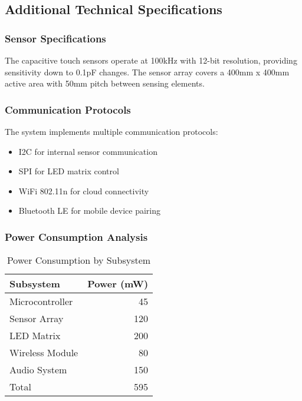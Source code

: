 \documentclass[final]{designreport}
\begin{document}
\printbibliography

\makeappendix

\subsection{Additional Technical Specifications}

\subsubsection{Sensor Specifications}
The capacitive touch sensors operate at 100kHz with 12-bit resolution, providing sensitivity down to 0.1pF changes. The sensor array covers a 400mm x 400mm active area with 50mm pitch between sensing elements.

\subsubsection{Communication Protocols}
The system implements multiple communication protocols:
\begin{itemize}
    \item I2C for internal sensor communication
    \item SPI for LED matrix control  
    \item WiFi 802.11n for cloud connectivity
    \item Bluetooth LE for mobile device pairing
\end{itemize}

\subsubsection{Power Consumption Analysis}
\begin{table}[htbp]
\centering
\caption{Power Consumption by Subsystem}
\begin{tabular}{@{}lr@{}}
\toprule
Subsystem & Power (mW) \\
\midrule
Microcontroller & 45 \\
Sensor Array & 120 \\
LED Matrix & 200 \\
Wireless Module & 80 \\
Audio System & 150 \\
\midrule
Total & 595 \\
\bottomrule
\end{tabular}
\end{table}
\end{document}
